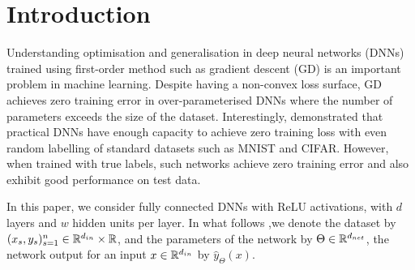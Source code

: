 \section{Introduction}
Understanding optimisation and generalisation in deep neural networks (DNNs) trained using first-order method such as gradient descent (GD) is an important problem in machine learning. Despite having a non-convex loss surface, GD achieves zero training error in over-parameterised DNNs where the number of parameters exceeds the size of the dataset. Interestingly, \cite{ben} demonstrated that practical DNNs have enough capacity to achieve zero training loss with even random labelling of standard datasets such as MNIST and CIFAR. However, when trained with true labels, such networks achieve zero training error and also exhibit good performance on test data. 

In this paper, we consider fully connected DNNs with ReLU activations, with $d$ layers and $w$ hidden units per layer. In what follows ,we denote the dataset by $(x_s,y_s)_{s=1}^n\in \mathbb{R}^{d_{in}}\times \mathbb{R}$, and the parameters of the network by $\Theta\in \mathbb{R}^{d_{net}}$, the network output for an input $x\in \mathbb{R}^{d_{in}}$ by $\hat{y}_{\Theta}(x)$.

